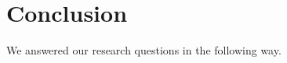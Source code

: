 \chapter{Conclusion}
\label{chapter:conclusion}

We answered our research questions in the following way.